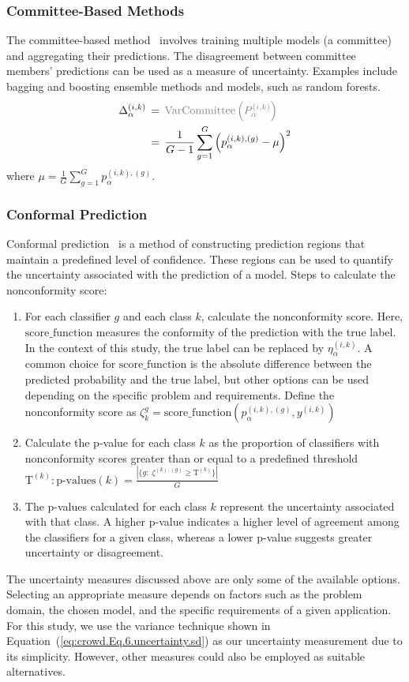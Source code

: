 \documentclass[default]{bst/sn-jnl_mine}%
\begin{document}
\subsubsection{Committee-Based Methods}
The committee-based method~\cite{wang_Wisdom_2020} involves training multiple models (a committee) and aggregating their predictions. The disagreement between committee members' predictions can be used as a measure of uncertainty. Examples include bagging and boosting ensemble methods and models, such as random forests.
\begin{align}
    \Delta_{\alpha}^{(i,k)}
    \, & = \, \textcolor{gray}{\mathrm{VarCommittee}\left(P_{\alpha}^{(i,k)}\right)} \\
    \, & = \, \frac{1}{G-1} \sum_{g=1}^G {\left(p_{\alpha}^{(i,k),(g)}-\mu\right)}^{2}
    \label{eq:crowd.Eq.8.uncertainty.committee_based}
\end{align}
where $\mu= \frac{1}{G} \sum_{g=1}^G p_{\alpha}^{(i,k),(g)}$.
\subsubsection{Conformal Prediction}
Conformal prediction~\cite{angelopoulos_Gentle_2021} is a method of constructing prediction regions that maintain a predefined level of confidence. These regions can be used to quantify the uncertainty associated with the prediction of a model.
Steps  to calculate the nonconformity score:
\begin{enumerate}
    \item For each classifier $g $ and each class $k $, calculate the nonconformity score. Here, $\mathrm{score\_function}$ measures the conformity of the prediction with the true label. In the context of this study, the true label can be replaced by $\eta_{\alpha}^{(i,k)} $. A common choice for $\mathrm{score\_function}$ is the absolute difference between the predicted probability and the true label, but other options can be used depending on the specific problem and requirements. Define the nonconformity score as $ \zeta_{k}^{g} = \mathrm{score\_function} \left(p_{\alpha}^{(i,k),(g)}, y^{(i,k)}\right) $
    \item Calculate the p-value for each class $k $ as the proportion of classifiers with nonconformity scores greater than or equal to a predefined threshold $\text{T}^{(k)}: \text{p-values}(k) = \frac{ \left\vert \{g: \;\zeta^{(k),(g)} \geq \text{T}^{(k)} \} \right\vert} {G} $
    \item The p-values calculated for each class $k $ represent the uncertainty associated with that class. A higher p-value indicates a higher level of agreement among the classifiers for a given class, whereas a lower p-value suggests greater uncertainty or disagreement.
\end{enumerate}
The uncertainty measures discussed above are only some of the available options. Selecting an appropriate measure depends on factors such as the problem domain, the chosen model, and the specific requirements of a given application. For this study, we use the variance technique shown in Equation~(\ref{eq:crowd.Eq.6.uncertainty.sd}) as our uncertainty measurement due to its simplicity. However, other measures could also be employed as suitable alternatives.
\end{document}
